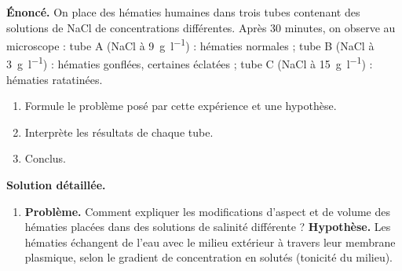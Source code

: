 \documentclass[11pt]{article}
\begin{document}
\begin{exoresolu}
\textbf{Énoncé.} On place des hématies humaines dans trois tubes contenant des solutions de NaCl de concentrations différentes. Après 30 minutes, on observe au microscope : tube A (NaCl à \SI{9}{\gram\per\litre}) : hématies normales ; tube B (NaCl à \SI{3}{\gram\per\litre}) : hématies gonflées, certaines éclatées ; tube C (NaCl à \SI{15}{\gram\per\litre}) : hématies ratatinées.
\begin{enumerate}
\item Formule le problème posé par cette expérience et une hypothèse.
\item Interprète les résultats de chaque tube.
\item Conclus.
\end{enumerate}
\tcblower
\textbf{Solution détaillée.}
\begin{enumerate}
\item \textbf{Problème.} Comment expliquer les modifications d'aspect et de volume des hématies placées dans des solutions de salinité différente ? \textbf{Hypothèse.} Les hématies échangent de l'eau avec le milieu extérieur à travers leur membrane plasmique, selon le gradient de concentration en solutés (tonicité du milieu).


\end{enumerate}
\end{exoresolu}
\end{document}
